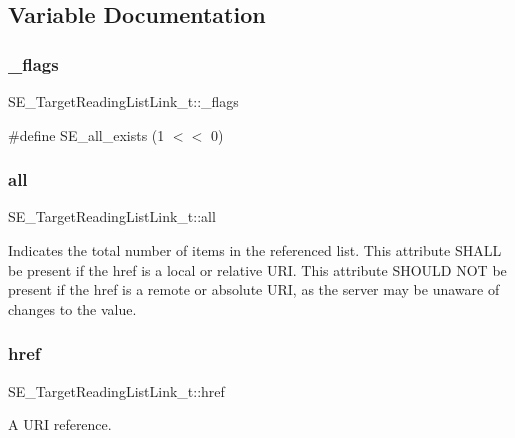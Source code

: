 \subsection{Variable Documentation}
\mbox{\label{group__TargetReadingListLink_gaf9ae193291ad0d9b0f964f277bebb433}} 
\subsubsection{\texorpdfstring{\+\_\+flags}{\_flags}}
{\footnotesize\ttfamily S\+E\+\_\+\+Target\+Reading\+List\+Link\+\_\+t\+::\+\_\+flags}

\#define S\+E\+\_\+all\+\_\+exists (1 $<$$<$ 0) \mbox{\label{group__TargetReadingListLink_ga9a98530d8abad37e41a80192356f52a3}} 
\subsubsection{\texorpdfstring{all}{all}}
{\footnotesize\ttfamily S\+E\+\_\+\+Target\+Reading\+List\+Link\+\_\+t\+::all}

Indicates the total number of items in the referenced list. This attribute S\+H\+A\+LL be present if the href is a local or relative U\+RI. This attribute S\+H\+O\+U\+LD N\+OT be present if the href is a remote or absolute U\+RI, as the server may be unaware of changes to the value. \mbox{\label{group__TargetReadingListLink_ga0c31f771ab4c6cc09d0a4326e42810b6}} 
\subsubsection{\texorpdfstring{href}{href}}
{\footnotesize\ttfamily S\+E\+\_\+\+Target\+Reading\+List\+Link\+\_\+t\+::href}

A U\+RI reference. 